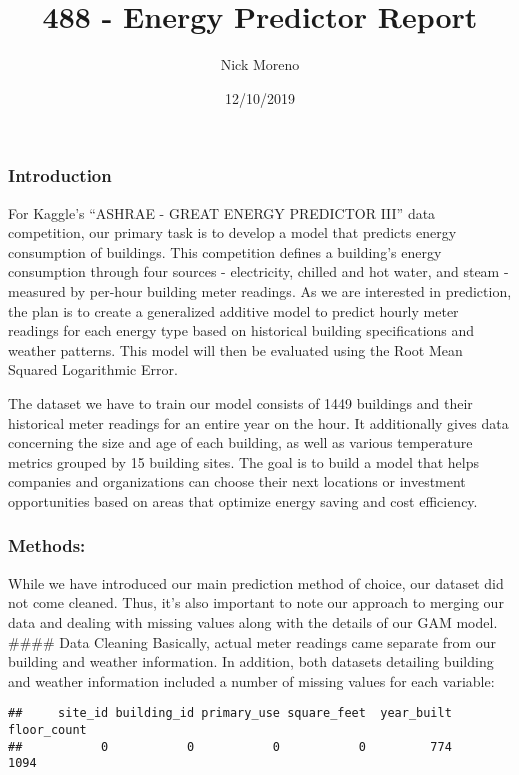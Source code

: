 \documentclass[]{article}
\title{488 - Energy Predictor Report}
\author{Nick Moreno}
\date{12/10/2019}
\begin{document}
\maketitle

\hypertarget{introduction}{%
\subsubsection{Introduction}\label{introduction}}

For Kaggle's ``ASHRAE - GREAT ENERGY PREDICTOR III'' data competition,
our primary task is to develop a model that predicts energy consumption
of buildings. This competition defines a building's energy consumption
through four sources - electricity, chilled and hot water, and steam -
measured by per-hour building meter readings. As we are interested in
prediction, the plan is to create a generalized additive model to
predict hourly meter readings for each energy type based on historical
building specifications and weather patterns. This model will then be
evaluated using the Root Mean Squared Logarithmic Error.

The dataset we have to train our model consists of 1449 buildings and
their historical meter readings for an entire year on the hour. It
additionally gives data concerning the size and age of each building, as
well as various temperature metrics grouped by 15 building sites. The
goal is to build a model that helps companies and organizations can
choose their next locations or investment opportunities based on areas
that optimize energy saving and cost efficiency.

\hypertarget{methods}{%
\subsubsection{Methods:}\label{methods}}

While we have introduced our main prediction method of choice, our
dataset did not come cleaned. Thus, it's also important to note our
approach to merging our data and dealing with missing values along with
the details of our GAM model. \#\#\#\# Data Cleaning Basically, actual
meter readings came separate from our building and weather information.
In addition, both datasets detailing building and weather information
included a number of missing values for each variable:

\begin{verbatim}
##     site_id building_id primary_use square_feet  year_built floor_count 
##           0           0           0           0         774        1094
\end{verbatim}
\end{document}
